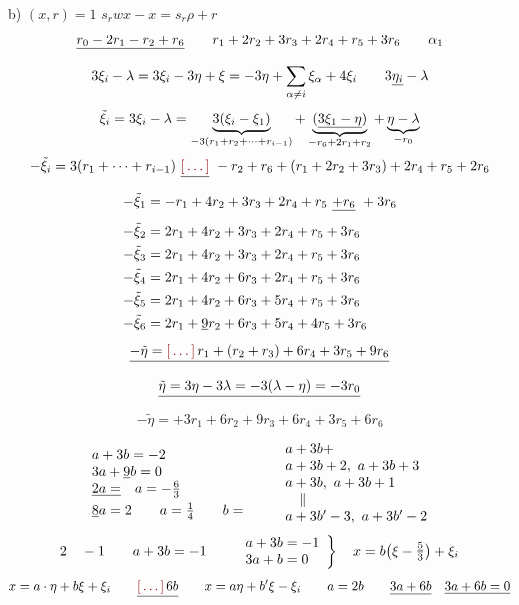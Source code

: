 \documentclass[11pt,a4paper]{article}
\begin{document}
b) $(x,r)=1$ \ill{} \quad $s_rwx-x=s_r\rho+r$
\[
  \struck{r_0-2r_1-r_2+r_6}\qquad
  r_1+2r_2+3r_3+2r_4+r_5+3r_6 \qquad \alpha_1
\]
\[
  3\xi_i-\lambda=3\xi_i-3\eta+\xi=-3\eta+\sum_{\alpha\neq i}\xi_\alpha+4\xi_i
  \qquad 3\uncertain{\eta_i}-\lambda
\]
\[
  \tilde\xi_i=3\xi_i-\lambda=
  \underbrace{3(\xi_i-\xi_1)}_{-3(r_1+r_2+\cdots+r_{i-1})}
  +\underbrace{(\uncertain{3\xi_1-\eta})}_{-r_6+2r_1+r_2}
  +\underbrace{\eta-\lambda}_{-r_0}
\]
\[
  -\tilde\xi_i=3(r_1+\cdots+r_{i-1})\ \struck{\ill{}}\ -r_2+r_6
  +(r_1+2r_2+3r_3)+2r_4+r_5+2r_6
\]
\[
\begin{aligned}
  -\tilde\xi_1&=-r_1+4r_2+3r_3+2r_4+r_5\ \struck{+r_6}\ +3r_6\\
  -\tilde\xi_2&=2r_1+4r_2+3r_3+2r_4+r_5+3r_6\\
  -\tilde\xi_3&=2r_1+4r_2+3r_3+2r_4+r_5+3r_6\\
  -\tilde\xi_4&=2r_1+4r_2+6r_3+2r_4+r_5+3r_6\\
  -\tilde\xi_5&=2r_1+4r_2+6r_3+5r_4+r_5+3r_6\\
  -\tilde\xi_6&=2r_1+\uncertain{9}r_2+6r_3+5r_4+4r_5+3r_6
\end{aligned}
\]
\[
  \struck{-\tilde\eta=\ill{}\,r_1+(r_2+r_3)+6r_4+3r_5+9r_6}
\]
\[
  \struck{\tilde\eta=3\eta-3\lambda=-3(\lambda-\eta)=-3r_0}
\]
\[
  -\tilde\eta=+3r_1+6r_2+9r_3+6r_4+3r_5+6r_6
\]

\[
\begin{array}{l}
  a+3b=-2\\
  3a+\uncertain{9}b=0\\
  \struck{2a=}\quad a=-\tfrac{6}{3}\\
  \uncertain{8}a=2\qquad a=\tfrac14\qquad b=
\end{array}
\qquad
\begin{array}{l}
  a+3b+\\
  a+3b+2,\ a+3b+3\\
  a+3b,\ a+3b+1\\
  \quad\parallel\\
  a+3b'-3,\ a+3b'-2
\end{array}
\]
\[
  2\quad -1\qquad a+3b=-1\qquad
  \left.\begin{array}{l}a+3b=-1\\ 3a+b=0\end{array}\right\rbrace\quad
  x=b\bigl(\xi-\tfrac{\uncertain{5}}{3}\bigr)+\xi_i
\]
\[
  x=a\cdot\eta+b\xi+\xi_i\qquad \struck{\ill{}\,6b}\qquad
  x=a\eta+b'\xi-\xi_i\qquad a=2b\qquad \struck{3a+6b}\quad
  \underline{3a+6b=0}
\]
\end{document}
